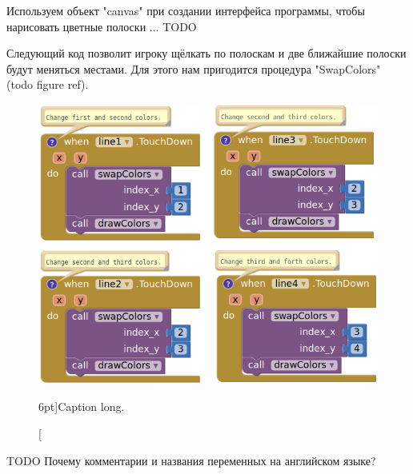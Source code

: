 Используем объект "canvas" при создании интерфейса программы, чтобы нарисовать 
цветные полоски ... TODO

Следующий код позволит игроку щёлкать по полоскам 
и две ближайшие полоски будут меняться местами. 
Для этого нам пригодится процедура "SwapColors" (todo figure ref). 

\begin{figure}
  \includegraphics{./graphics/programs/change_flags/click_and_swap_colors_2018.png}
    \caption[Caption short.][6pt]{Caption long.
    }
  \label{fig:block:click:swap:colors}
\end{figure}

TODO Почему комментарии и названия переменных на английском языке?
